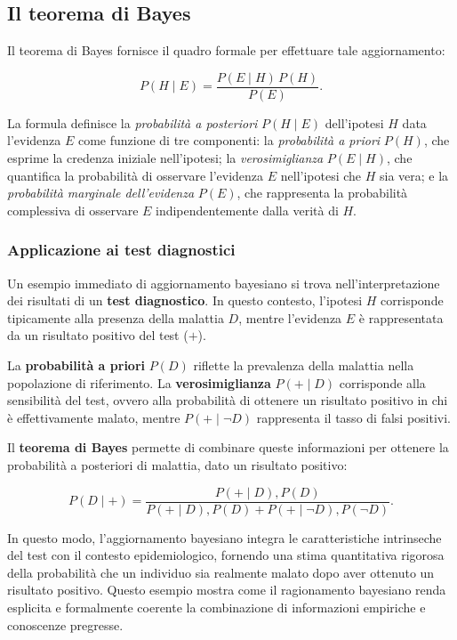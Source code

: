 \documentclass[
  letterpaper,
  DIV=11,
  numbers=noendperiod,
  oneside]{scrreprt}
\theoremstyle{definition}
\theoremstyle{plain}
\theoremstyle{definition}
\theoremstyle{remark}
\begin{document}
\subsection{Il teorema di Bayes}\label{il-teorema-di-bayes}

Il teorema di Bayes fornisce il quadro formale per effettuare tale
aggiornamento:

\[
P(H \mid E) = \frac{P(E \mid H) \, P(H)}{P(E)}.
\]

La formula definisce la \emph{probabilità a posteriori} \(P(H \mid E)\)
dell'ipotesi \(H\) data l'evidenza \(E\) come funzione di tre
componenti: la \emph{probabilità a priori} \(P(H)\), che esprime la
credenza iniziale nell'ipotesi; la \emph{verosimiglianza}
\(P(E \mid H)\), che quantifica la probabilità di osservare l'evidenza
\(E\) nell'ipotesi che \(H\) sia vera; e la \emph{probabilità marginale
dell'evidenza} \(P(E)\), che rappresenta la probabilità complessiva di
osservare \(E\) indipendentemente dalla verità di \(H\).

\subsubsection{Applicazione ai test
diagnostici}\label{applicazione-ai-test-diagnostici}

Un esempio immediato di aggiornamento bayesiano si trova
nell'interpretazione dei risultati di un \textbf{test diagnostico}. In
questo contesto, l'ipotesi \(H\) corrisponde tipicamente alla presenza
della malattia \(D\), mentre l'evidenza \(E\) è rappresentata da un
risultato positivo del test (\(+\)).

La \textbf{probabilità a priori} \(P(D)\) riflette la prevalenza della
malattia nella popolazione di riferimento. La \textbf{verosimiglianza}
\(P(+ \mid D)\) corrisponde alla sensibilità del test, ovvero alla
probabilità di ottenere un risultato positivo in chi è effettivamente
malato, mentre \(P(+ \mid \neg D)\) rappresenta il tasso di falsi
positivi.

Il \textbf{teorema di Bayes} permette di combinare queste informazioni
per ottenere la probabilità a posteriori di malattia, dato un risultato
positivo:

\[
P(D \mid +) =
\frac{P(+ \mid D) , P(D)}
{P(+ \mid D) , P(D) + P(+ \mid \neg D) , P(\neg D)}.
\]

In questo modo, l'aggiornamento bayesiano integra le caratteristiche
intrinseche del test con il contesto epidemiologico, fornendo una stima
quantitativa rigorosa della probabilità che un individuo sia realmente
malato dopo aver ottenuto un risultato positivo. Questo esempio mostra
come il ragionamento bayesiano renda esplicita e formalmente coerente la
combinazione di informazioni empiriche e conoscenze pregresse.
\end{document}
